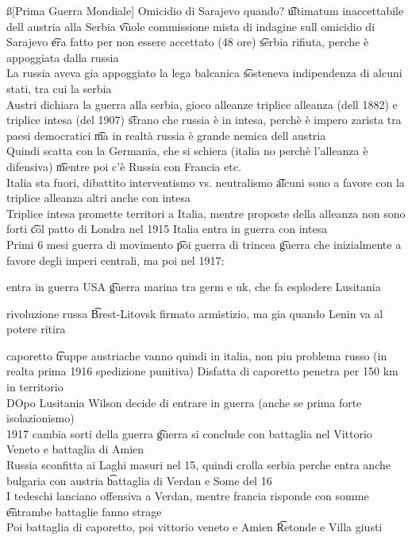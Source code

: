 \documentclass[12pt]{article}
\begin{document}
\ss[Prima Guerra Mondiale]
Omicidio di Sarajevo quando? \t ultimatum inaccettabile dell austria alla Serbia \t vuole commissione mista di indagine sull omicidio di Sarajevo \t era fatto per non essere accettato (48 ore) \t serbia rifiuta, perche è appoggiata dalla russia \\
La russia aveva gia appoggiato la lega balcanica \t sosteneva indipendenza di alcuni stati, tra cui la serbia \\
Austri dichiara la guerra alla serbia, gioco alleanze triplice alleanza (dell 1882) e triplice intesa (del 1907) \t strano che russia è in intesa, perchè è impero zarista tra paesi democratici \t ma in realtà russia è grande nemica dell austria \\
Quindi scatta con la Germania, che si schiera (italia no perchè l'alleanza è difensiva) \t mentre poi c'è Russia con Francia etc. \\
Italia sta fuori, dibattito interventismo vs. neutralismo \t alcuni sono a favore con la triplice alleanza altri anche con intesa \\
Triplice intesa promette territori a Italia, mentre proposte della alleanza non sono forti \t col patto di Londra nel 1915 Italia entra in guerra con intesa \\
Primi 6 mesi guerra di movimento \t poi guerra di trincea \t guerra che inizialmente a favore degli imperi centrali, ma poi nel 1917:
\bi
  \item entra in guerra USA \t guerra marina tra germ e uk, che fa esplodere Lusitania
  \item rivoluzione russa \t Brest-Litovsk firmato armistizio, ma gia quando Lenin va al potere ritira
  \item caporetto \t truppe austriache vanno quindi in italia, non piu problema russo (in realta prima 1916 spedizione punitiva)
\ei
Disfatta di caporetto penetra per 150 km in territorio \\
DOpo Lusitania Wilson decide di entrare in guerra (anche se prima forte isolazionismo) \\
1917 cambia sorti della guerra \t guerra si conclude con battaglia nel Vittorio Veneto e battaglia di Amien \\
Russia sconfitta ai Laghi masuri nel 15, quindi crolla serbia perche entra anche bulgaria con austria \t battaglia di Verdan e Some del 16 \\
I tedeschi lanciano offensiva a Verdan, mentre francia risponde con somme \t entrambe battaglie fanno strage \\
Poi battaglia di caporetto, poi vittorio veneto e Amien \t Retonde e Villa giusti
\end{document}
